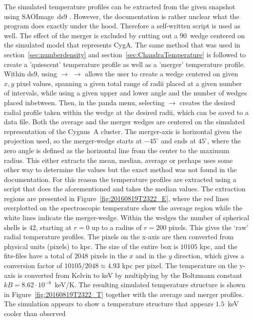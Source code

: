 \documentclass[MScProj_TLRH_ClusterEnergy.tex]{subfiles}
\begin{document}
The simulated temperature profiles can be extracted from the given snapshot using 
SAOImage~ds9 \citep{2003ASPC..295..489J}. However, the documentation is rather
unclear what the program does exactly under the hood. Therefore a self-written 
 script is used as well. The effect of the merger is excluded by
cutting out a 90\deg \, wedge centered on the simulated model that represents
CygA. The same method that was used in section~\ref{sec:numberdensity} and 
section~\ref{sec:ChandraTemperature} is followed to create a 'quiescent' 
temperature profile as well as a 'merger' temperature profile. Within ds9, using
 $\rightarrow$  $\rightarrow$  allows the
user to create a wedge centered on given $x, y$ pixel values, spanning a given
total range of radii placed at a given number of intervals, while using a given
upper and lower angle and the number of wedges placed inbetween. Then, in the 
panda menu, selecting  $\rightarrow$  creates
the desired radial profile taken within the wedge at the desired radii, which can
be saved to a data file. Both the average and the merger wedges are centered on 
the simulated representation of the Cygnus~A cluster. The merger-axis is horizontal 
given the projection used, so the merger-wedge starts at $-45^\circ$ and ends at 
$45^\circ$, where the zero angle is defined as the horizontal line from the center
to the maximum radius. This either extracts the mean, median, average or perhaps
uses some other way to determine the values but the exact method was not found
in the documentation. For this reason the temperature profiles are extracted
using a  script that does the aforementioned and takes the median
values. The extraction regions are presented in Figure~\ref{fig:20160819T2322_E},
where the red lines overplotted on the spectroscopic temperature show the average
region while the white lines indicate the merger-wedge. Within the wedges the
number of spherical shells is $42$, starting at $r=0$ up to a radius of $r=200$ 
pixels. This gives the `raw' radial temperature profiles. The pixels on the x-axis 
are then converted from physical units (pixels) to kpc. The size of the entire box
is $10105$ kpc, and the fits-files have a total of $2048$ pixels in the $x$ and in
the $y$ direction, which gives a conversion factor of $10105/2048\approx 4.93$ kpc 
per pixel. The temperature on the y-axis is converted from Kelvin to keV by 
multiplying by the Boltzmann constant $kB = 8.62 \cdot 10^{-8}$~keV/K. The resulting 
simulated temperature structure is shown in Figure~\ref{fig:20160819T2322_T}
together with the average and merger  profiles. The simulation
appears to show a temperature structure that appears $1.5$~keV cooler than
observed
\end{document}
